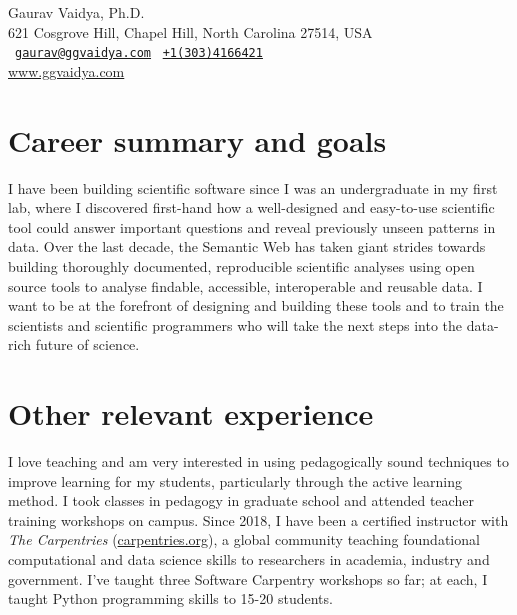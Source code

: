 \documentclass[12pt,letter]{article}
\begin{document}
\thispagestyle{plain}

\begin{center}

{\selectfont
\Large Gaurav Vaidya, Ph.D. \\
\small
621 Cosgrove Hill, Chapel Hill, North Carolina 27514, USA \\
\Letter~{\tt \href{mailto:gaurav@ggvaidya.com}{gaurav@ggvaidya.com}}
\hspace{0.25em}
\Telefon~{\tt \href{tel:+13034166421}{+1\hspace{0.3em}(303)\hspace{0.3em}416\hspace{0.3em}6421}\hspace{0.3em}} \\
\url{www.ggvaidya.com}
}

\vspace{-1em}

\end{center}

\normalfont

\selectfont

\part{Career summary and goals}

I have been building scientific software since I was an undergraduate in my first lab, where I discovered first-hand how a well-designed and easy-to-use scientific tool could answer important questions and reveal previously unseen patterns in data. Over the last decade, the Semantic Web has taken giant strides towards building thoroughly documented, reproducible scientific analyses using open source tools to analyse findable, accessible, interoperable and reusable data. I want to be at the forefront of designing and building these tools and to train the scientists and scientific programmers who will take the next steps into the data-rich future of science.





\part{Other relevant experience}

I love teaching and am very interested in using pedagogically sound techniques to improve learning for my students, particularly through the active learning method. I took classes in pedagogy in graduate school and attended teacher training workshops on campus. Since 2018, I have been a certified instructor with \textit{The Carpentries} (\href{https://carpentries.org/}{carpentries.org}), a global community teaching foundational computational and data science skills to researchers in academia, industry and government. I've taught three Software Carpentry workshops so far; at each, I taught Python programming skills to 15-20 students.
\end{document}
